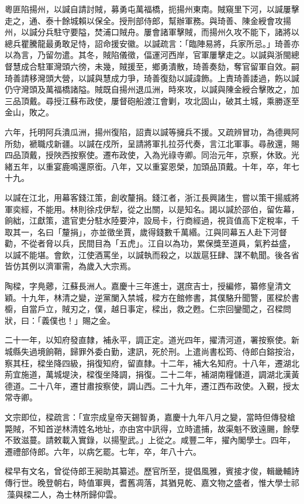 \begin{pinyinscope}
粵匪陷揚州，以諴自請討賊，募勇屯萬福橋，扼揚州東南。賊窺里下河，以諴屢擊走之，通、泰十餘城賴以保全。授刑部侍郎，幫辦軍務。與琦善、陳金綬會攻揚州，以諴分兵駐守要隘，焚浦口賊舟。屢會諸軍擊賊，而揚州久攻不能下，諸將以總兵瞿騰龍最勇敢足恃，詔命援安徽。以諴疏言：「臨陣易將，兵家所忌。」琦善亦以為言，乃留勿遣。其冬，賊陷儀徵，偪運河西岸，官軍屢擊走之。以諴與浙閩總督慧成合駐軍灣頭六徬，未幾，賊援至，鄉勇潰散，琦善奏劾，奪官留軍自效。嗣琦善請移灣頭大營，以諴與慧成力爭，琦善復劾以諴諱飾。上責琦善諉過，飭以諴仍守灣頭及萬福橋諸隘。賊既自揚州退瓜洲，時來攻，以諴與陳金綬合擊敗之，加三品頂戴。尋授江蘇布政使，屢督砲船渡江會剿，攻北固山，破其土城，乘勝逐至金山，敗之。

六年，托明阿兵潰瓜洲，揚州復陷，詔責以諴等擁兵不援。又疏辨冒功，為德興阿所劾，褫職戍新疆。以諴在戍所，呈請將軍扎拉芬代奏，言江北軍事。尋赦還，賜四品頂戴，授陜西按察使。遷布政使，入為光祿寺卿。同治元年，京察，休致。光緒五年，以重宴鹿鳴還原銜。八年，又以重宴恩榮，加頭品頂戴。十年，卒，年七十九。

以諴在江北，用幕客錢江策，創收釐捐。錢江者，浙江長興諸生，嘗以策干揚威將軍奕經，不能用。林則徐戍伊犁，從之出關，以是知名。謁以諴於邵伯，留佐幕，餉絀，江獻策，遣官吏分駐水陸要沖，設局卡，行商經過，視貨值高下定稅率，千取其一，名曰「釐捐」，亦並徵坐賈，歲得錢數千萬緡。江與同幕五人赴下河督勸，不從者脅以兵，民間目為「五虎」。江自以為功，累保獎至道員，氣矜益盛，以諴不能堪。會飲，江使酒罵坐，以諴執而殺之，以跋扈狂肆、謀不軌聞。後各省皆仿其例以濟軍需，為歲入大宗焉。

陶樑，字鳧薌，江蘇長洲人。嘉慶十三年進士，選庶吉士，授編修，纂修皇清文穎。十九年，林清之變，逆黨闌入禁城，樑方在館修書，其僕駱升聞警，匿樑於書櫥，自當戶立，賊刃之，僕，越日事定，樑出，救之甦。仁宗回鑾聞之，召樑問狀，曰：「義僕也！」賜之金。

二十一年，以知府發直隸，補永平，調正定。道光四年，擢清河道，署按察使。新城縣失過境餉鞘，歸罪外委白勤，逮訊，死於刑。上遣尚書松筠、侍郎白鎔按治，察其枉，樑坐降四級，捐復知府，留直隸。十二年，補大名知府。十八年，遷湖北荊宜施道，萬城堤決，樑復坐降調，捐復。二十二年，補湖南糧儲道，調湖北漢黃德道。二十八年，遷甘肅按察使，調山西。二十九年，遷江西布政使。入覲，授太常寺卿。

文宗即位，樑疏言：「宣宗成皇帝天錫智勇，嘉慶十九年八月之變，當時但傳發槍斃賊，不知首逆林清姓名地址，亦由宮中訊得，立時遣捕，故渠魁不致遠颺，餘孽不致滋蔓。請敕載入實錄，以揚聖武。」上從之。咸豐二年，擢內閣學士。四年，遷禮部侍郎。六年，以病乞罷。七年，卒，年八十六。

樑早有文名，曾從侍郎王昶助其纂述。歷官所至，提倡風雅，賓接才俊，輯畿輔詩傳行世。晚登朝右，時值軍興，耆舊凋落，其猶見乾、嘉文物之盛者，惟大學士祁藻與樑二人，為士林所歸仰雲。


\end{pinyinscope}
